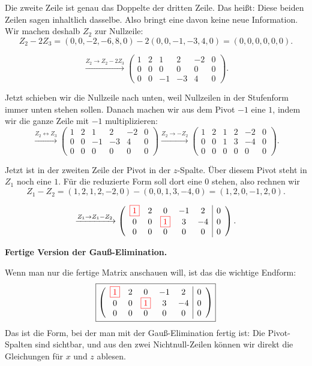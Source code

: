 \documentclass[a4paper,12pt]{article}
\newcommand{\piv}[1]{{\color{red}\boxed{#1}}}
\begin{document}
Die zweite Zeile ist genau das Doppelte der dritten Zeile.
Das hei\ss t: Diese beiden Zeilen sagen inhaltlich dasselbe.
Also bringt eine davon keine neue Information.
Wir machen deshalb $Z_2$ zur Nullzeile:
\[
Z_2-2Z_3
=
(0,0,-2,-6,8,0)-2(0,0,-1,-3,4,0)
=
(0,0,0,0,0,0).
\]

\[
\xrightarrow{Z_2\to Z_2-2Z_3}
\left(\begin{array}{ccccc|c}
1 & 2 & 1 & 2 & -2 & 0 \\
0 & 0 & 0 & 0 & 0 & 0 \\
0 & 0 & -1 & -3 & 4 & 0
\end{array}\right).
\]

Jetzt schieben wir die Nullzeile nach unten, weil Nullzeilen in der Stufenform immer unten stehen sollen.
Danach machen wir aus dem Pivot $-1$ eine $1$, indem wir die ganze Zeile mit $-1$ multiplizieren:
\[
\xrightarrow{Z_2\leftrightarrow Z_3}
\left(\begin{array}{ccccc|c}
1 & 2 & 1 & 2 & -2 & 0 \\
0 & 0 & -1 & -3 & 4 & 0 \\
0 & 0 & 0 & 0 & 0 & 0
\end{array}\right)
\xrightarrow{Z_2\to -Z_2}
\left(\begin{array}{ccccc|c}
1 & 2 & 1 & 2 & -2 & 0 \\
0 & 0 & 1 & 3 & -4 & 0 \\
0 & 0 & 0 & 0 & 0 & 0
\end{array}\right).
\]

Jetzt ist in der zweiten Zeile der Pivot in der $z$-Spalte.
\"Uber diesem Pivot steht in $Z_1$ noch eine $1$.
F\"ur die reduzierte Form soll dort eine $0$ stehen, also rechnen wir
\[
Z_1-Z_2
=
(1,2,1,2,-2,0)-(0,0,1,3,-4,0)
=
(1,2,0,-1,2,0).
\]

\[
\xrightarrow{Z_1\to Z_1-Z_2}
\left(\begin{array}{ccccc|c}
\piv{1} & 2 & 0 & -1 & 2 & 0 \\
0 & 0 & \piv{1} & 3 & -4 & 0 \\
0 & 0 & 0 & 0 & 0 & 0
\end{array}\right).
\]

\textbf{Fertige Version der Gau\ss-Elimination.}

Wenn man nur die fertige Matrix anschauen will, ist das die wichtige Endform:
\[
\boxed{
\left(\begin{array}{ccccc|c}
\piv{1} & 2 & 0 & -1 & 2 & 0 \\
0 & 0 & \piv{1} & 3 & -4 & 0 \\
0 & 0 & 0 & 0 & 0 & 0
\end{array}\right)
}
\]
Das ist die Form, bei der man mit der Gau\ss-Elimination fertig ist:
Die Pivot-Spalten sind sichtbar, und aus den zwei Nichtnull-Zeilen k\"onnen wir direkt die Gleichungen f\"ur $x$ und $z$ ablesen.
\end{document}
